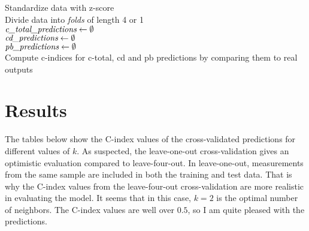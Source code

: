\documentclass[a4paper]{article}
\begin{document}
\begin{algorithm}[H]
 
 \vspace*{0,5cm}

 Standardize data with z-score\\
 Divide data into \emph{folds} of length 4 or 1\\
 
 
 $\emph{c\_total\_predictions} \leftarrow \emptyset$\\
 $\emph{cd\_predictions} \leftarrow \emptyset$\\
 $\emph{pb\_predictions} \leftarrow \emptyset$\\

 
 Compute c-indices for c-total, cd and pb predictions by comparing them to real outputs
 
\end{algorithm}

\section{Results}
The tables below show the C-index values of the cross-validated predictions for different values of $k$. As suspected, the leave-one-out cross-validation gives an optimistic evaluation compared to leave-four-out. In leave-one-out, measurements from the same sample are included in both the training and test data. That is why the C-index values from the leave-four-out cross-validation are more realistic in evaluating the model. It seems that in this case, $k = 2$ is the optimal number of neighbors. The C-index values are well over $0.5$, so I am quite pleased with the predictions.
\vspace*{1cm}
\end{document}
